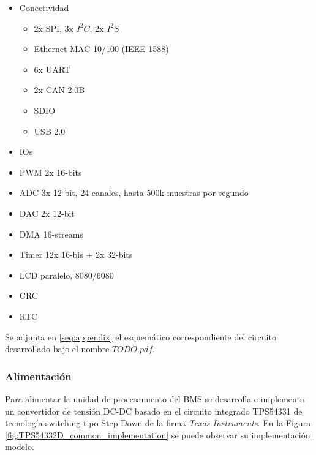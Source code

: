 \documentclass[10pt,a4paper]{article}
\begin{document}
\begin{itemize}
\begin{itemize}
    \item Conectividad

        \begin{itemize}                                                                  
            \item 2x SPI, 3x $I^2C$, 2x $I^2S$
            \item Ethernet MAC 10/100 (IEEE 1588)
            \item 6x UART 
            \item 2x CAN 2.0B 
            \item SDIO 
            \item USB 2.0 
        \end{itemize}

    \item IOs
    \item PWM 2x 16-bits
    \item ADC 3x 12-bit, 24 canales, hasta 500k muestras por segundo              
    \item DAC 2x 12-bit 
    \item DMA 16-streams
    \item Timer 12x 16-bis + 2x 32-bits 
    \item LCD paralelo, 8080/6080 
    \item CRC
    \item RTC
\end{itemize}                                                                    
                                                                                 
Se adjunta en \autoref{seq:appendix} el esquemático correspondiente del circuito 
desarrollado bajo el nombre $TODO.pdf$.                   
                                                                                 
\subsubsection{Alimentación}

Para alimentar la unidad de procesamiento del \acrshort{BMS} se desarrolla e
implementa un convertidor de tensión DC-DC basado en el circuito integrado
TPS54331 de tecnología switching tipo Step Down de la firma \emph{Texas
Instruments}. En la Figura \ref{fig:TPS54332D_common_implementation} se puede
observar su implementación modelo. 


\end{itemize}
\end{document}
